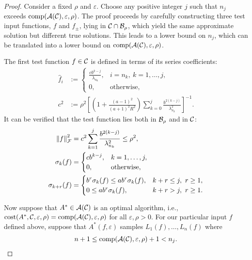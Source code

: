 \documentclass[graybox,footinfo]{svmult}
\newcommand{\DHJRnorm}[2][{}]{\ensuremath{\left \lVert #2 \right \rVert}_{#1}}
\begin{document}
\begin{proof}
Consider a fixed $\rho$ and $\varepsilon$.  Choose any positive integer $j$ such that $n_j$ exceeds $\textup{comp}({\mathcal{A}}({\mathcal{C}}),\varepsilon,\rho)$.  The proof proceeds by carefully constructing three test input functions, $f$ and $f_{\pm}$, lying in ${\mathcal{C}} \cap {\mathcal{B}}_{\rho}$, which yield the same approximate solution but different true solutions.  This leads to a lower bound on $n_j$, which can be translated into a lower bound on $\textup{comp}({\mathcal{A}}({\mathcal{C}}),\varepsilon,\rho)$. 

The first test function $f \in {\mathcal{C}}$ is defined in terms of its series coefficients:
\begin{align}
\nonumber
\widehat{f}_i &:= \begin{cases}
\displaystyle
\frac{c b^{k-j}}{\lambda_{n_{k}}},  & i =  n_{k}, \ k = 1, \ldots, j,
\\
0, & \text{otherwise},
\end{cases}
\\
\label{cdef}
c^2 &:=  \rho^2 \left[ \left(1+\frac{(a-1)^2}{(a+1)^{2} R^2 }\right)\sum_{k=0}^j \frac{b^{2(k-j)}}{\lambda_{n_{k}}^2}\right]^{-1}.
\end{align}
It can be verified that the test function lies both in ${\mathcal{B}}_{\rho}$ and in ${\mathcal{C}}$:
\begin{align}
\label{testfunnorm}
\DHJRnorm[\calF]{f}^2 &=  c^2\sum_{k=1}^j \frac{ b^{2(k-j)}}{\lambda^2_{n_{k}}} \le \rho^2,
\\
\nonumber
\sigma_k(f) &= \begin{cases}
\displaystyle
c b^{k-j}, & k =1, \ldots, j, \\
0, & \text{otherwise},
\end{cases}
\\
\nonumber
\sigma_{k+r}(f) &= \begin{cases}
\displaystyle 
b^{r} \sigma_k(f) \le a b^r \sigma_k(f), & k+r \le j, \ r \ge 1,
\\
0 \le a b^r \sigma_k(f), & k+r > j, \ r \ge 1.
\end{cases}
\end{align}

Now suppose that $A^* \in {\mathcal{A}}({\mathcal{C}})$ is an optimal algorithm, i.e., $\textup{cost}(A^*,{\mathcal{C}},\varepsilon,\rho) =  \textup{comp}({\mathcal{A}}({\mathcal{C}}),\varepsilon,\rho)$ for all $\varepsilon, \rho > 0$.  For our particular input $f$ defined above, suppose that $A^*(f,\varepsilon)$ samples $L_1(f), \ldots, L_n(f)$ where 
\[
n + 1\le \textup{comp}({\mathcal{A}}({\mathcal{C}}),\varepsilon,\rho) +1 < n_j.
\]  


\end{proof}
\end{document}
